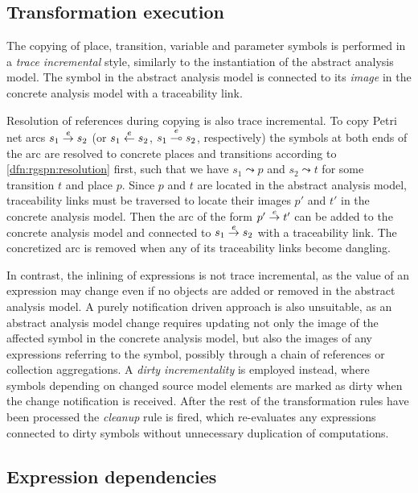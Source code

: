 \subsection{Transformation execution}
\label{sec:transform:execution}

The copying of place, transition, variable and parameter symbols is performed in a \emph{trace incremental} style, similarly to the instantiation of the abstract analysis model. The symbol in the abstract analysis model is connected to its \emph{image} in the concrete analysis model with a traceability link.

Resolution of references during copying is also trace incremental. To copy Petri net arcs \(s_1 \overset{e}{\rightarrow} s_2\) (or \(s_1 \overset{e}{\leftarrow} s_2\), \(s_1 \overset{e}{\multimap} s_2\), respectively) the symbols at both ends of the arc are resolved to concrete places and transitions according to \vref{dfn:rgspn:resolution} first, such that we have \(s_1 \leadsto p\) and \(s_2 \leadsto t\) for some transition \(t\) and place \(p\). Since \(p\) and \(t\) are located in the abstract analysis model, traceability links must be traversed to locate their images \(p'\) and \(t'\) in the concrete analysis model. Then the arc of the form \(p' \overset{e}{\rightarrow} t'\) can be added to the concrete analysis model and connected to \(s_1 \overset{e}{\rightarrow} s_2\) with a traceability link. The concretized arc is removed when any of its traceability links become dangling. 

In contrast, the inlining of expressions is not trace incremental, as the value of an expression may change even if no objects are added or removed in the abstract analysis model. A purely notification driven approach is also unsuitable, as an abstract analysis model change requires updating not only the image of the affected symbol in the concrete analysis model, but also the images of any expressions referring to the symbol, possibly through a chain of references or collection aggregations. A \emph{dirty incrementality} is employed instead, where symbols depending on changed source model elements are marked as dirty when the change notification is received. After the rest of the transformation rules have been processed the \emph{cleanup} rule is fired, which re-evaluates any expressions connected to dirty symbols without unnecessary duplication of computations.

\subsection{Expression dependencies}


